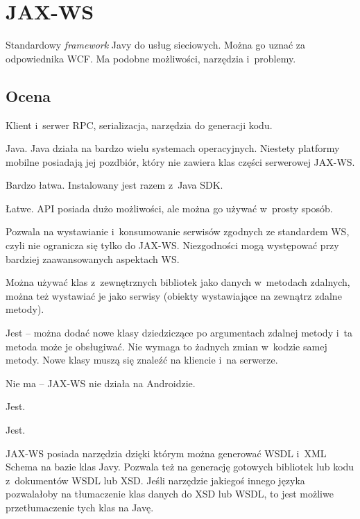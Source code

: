 \section{JAX-WS}
Standardowy \emph{framework} Javy do usług sieciowych. Można go uznać za odpowiednika WCF. Ma podobne możliwości, narzędzia i~problemy.

\subsection{Ocena}
\begin{description}
Klient i~serwer RPC, serializacja, narzędzia do generacji kodu.

Java. Java działa na bardzo wielu systemach operacyjnych. Niestety platformy mobilne posiadają jej pozdbiór, który nie zawiera klas części serwerowej JAX-WS.

Bardzo łatwa. Instalowany jest razem z~Java SDK.

Łatwe. API posiada dużo możliwości, ale można go używać w~prosty sposób.

Pozwala na wystawianie i~konsumowanie serwisów zgodnych ze standardem WS, czyli nie ogranicza się tylko do JAX-WS.
Niezgodności mogą występować przy bardziej zaawansowanych aspektach WS.

Można używać klas z~zewnętrznych bibliotek jako danych w~metodach zdalnych, można też wystawiać je jako serwisy (obiekty wystawiające na zewnątrz zdalne metody).

Jest -- można dodać nowe klasy dziedziczące po argumentach zdalnej metody i~ta metoda może je obsługiwać. Nie wymaga to żadnych zmian w~kodzie samej metody. Nowe klasy muszą się znaleźć na kliencie i~na serwerze.

Nie ma -- JAX-WS nie działa na Androidzie.

Jest.

Jest.

JAX-WS posiada narzędzia dzięki którym można generować WSDL i~XML Schema na bazie klas Javy.
Pozwala też na generację gotowych bibliotek lub kodu z~dokumentów WSDL lub XSD.
Jeśli narzędzie jakiegoś innego języka pozwalałoby na tłumaczenie klas danych do XSD lub WSDL, to jest możliwe przetłumaczenie tych klas na Javę.
\end{description}

